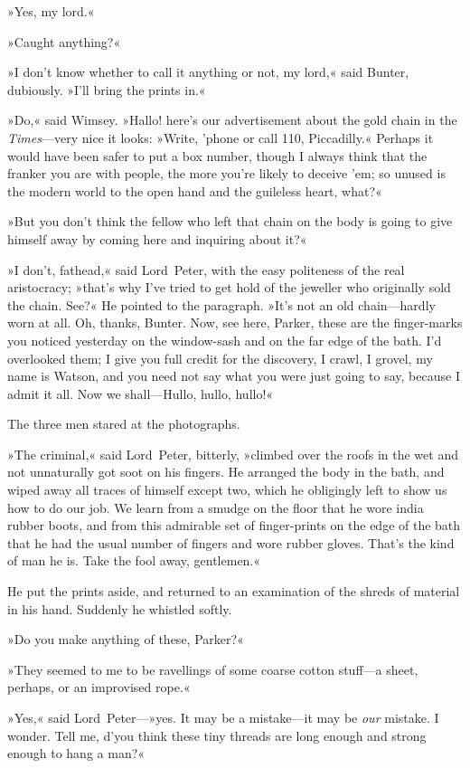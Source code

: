 »Yes, my lord.«

»Caught anything?«

»I don't know whether to call it anything or not, my lord,« said Bunter, dubiously. »I'll bring the prints in.«

»Do,« said Wimsey. »Hallo! here's our advertisement about the gold chain in the \textit{Times}---very nice it looks: »Write, 'phone or call 110, Piccadilly.« Perhaps it would have been safer to put a box number, though I always think that the franker you are with people, the more you're likely to deceive 'em; so unused is the modern world to the open hand and the guileless heart, what?«

»But you don't think the fellow who left that chain on the body is going to give himself away by coming here and inquiring about it?«

»I don't, fathead,« said Lord~Peter, with the easy politeness of the real aristocracy; »that's why I've tried to get hold of the jeweller who originally sold the chain. See?« He pointed to the paragraph. »It's not an old chain—hardly worn at all. Oh, thanks, Bunter. Now, see here, Parker, these are the finger-marks you noticed yesterday on the window-sash and on the far edge of the bath. I'd overlooked them; I give you full credit for the discovery, I crawl, I grovel, my name is Watson, and you need not say what you were just going to say, because I admit it all. Now we shall—Hullo, hullo, hullo!«

The three men stared at the photographs.

»The criminal,« said Lord~Peter, bitterly, »climbed over the roofs in the wet and not unnaturally got soot on his fingers. He arranged the body in the bath, and wiped away all traces of himself except two, which he obligingly left to show us how to do our job. We learn from a smudge on the floor that he wore india rubber boots, and from this admirable set of finger-prints on the edge of the bath that he had the usual number of fingers and wore rubber gloves. That's the kind of man he is. Take the fool away, gentlemen.«

He put the prints aside, and returned to an examination of the shreds of material in his hand. Suddenly he whistled softly.

»Do you make anything of these, Parker?«

»They seemed to me to be ravellings of some coarse cotton stuff—a sheet, perhaps, or an improvised rope.«

»Yes,« said Lord~Peter---»yes. It may be a mistake—it may be \textit{our} mistake. I wonder. Tell me, d'you think these tiny threads are long enough and strong enough to hang a man?«

